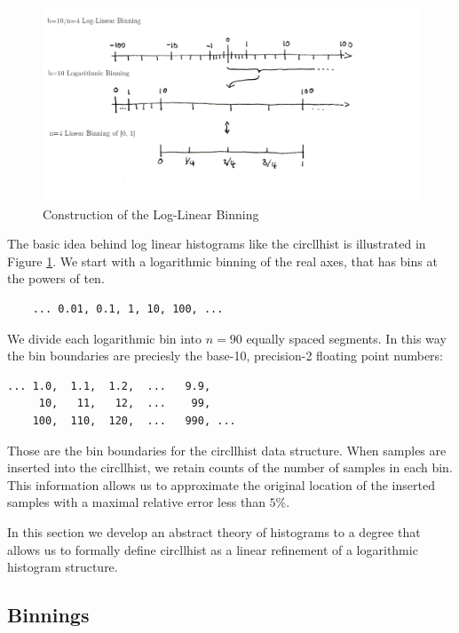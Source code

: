 \documentclass{article}
\theoremstyle{plain}
\theoremstyle{remark}
\begin{document}
\begin{figure}
  \includegraphics[width=\textwidth]{assets/LLBins.png}
  \caption{Construction of the Log-Linear Binning}
  \label{fig:llbins}
\end{figure}

The basic idea behind log linear histograms like the circllhist is illustrated in Figure \ref{fig:llbins}.
We start with a logarithmic binning of the real axes, that has bins at the powers of ten.
\begin{center}
  \begin{BVerbatim}
    ... 0.01, 0.1, 1, 10, 100, ...
  \end{BVerbatim}
\end{center}
We divide each logarithmic bin into $n=90$ equally spaced segments. In this way the bin boundaries
are preciesly the base-10, precision-2 floating point numbers:
\begin{center}
\begin{BVerbatim}
... 1.0,  1.1,  1.2,  ...   9.9,
     10,   11,   12,  ...    99,
    100,  110,  120,  ...   990, ...
\end{BVerbatim}
\end{center}
Those are the bin boundaries for the circllhist data structure.
When samples are inserted into the circllhist, we retain counts of the number of samples in each bin.
This information allows us to approximate the original location of the inserted samples with a
maximal relative error less than $5\%$.

In this section we develop an abstract theory of histograms to a degree that allows us to
formally define circllhist as a linear refinement of a logarithmic histogram structure.

\subsection{Binnings}
\end{document}
